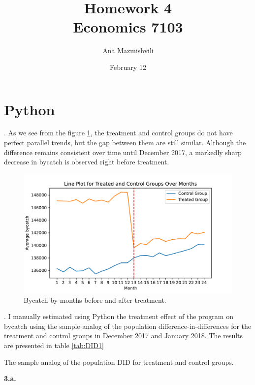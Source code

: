 \documentclass{article}
\title{Homework 4 \\ Economics 7103}
\author{Ana Mazmishvili}
\date{February 12}
\begin{document}
  
\maketitle

\section{Python}

. As we see from the figure \ref{fig:trend}, the treatment and control groups do not have perfect parallel trends, but the gap between them are still similar. Although the difference remains consistent over time until December 2017, a markedly sharp decrease in bycatch is observed right before treatment.

\begin{figure}[h]
    \centering
    \includegraphics{homework 4/output/figure/trend1.pdf}
    \caption{ Bycatch by months before and after treatment. }
    \label{fig:trend}
\end{figure}

\FloatBarrier

. I manually estimated using Python the treatment effect of the program on bycatch using the sample analog of the population difference-in-differences for the treatment and control groups in December 2017 and January 2018. The results are presented in table \ref{tab:DID1}

\begin{table}[h]
    \centering
    
    \caption{The sample analog of the population DID for treatment and control groups.}
    \label{tab:DID1}
\end{table}

\FloatBarrier

\noindent \textbf{3.a. }
\end{document}

